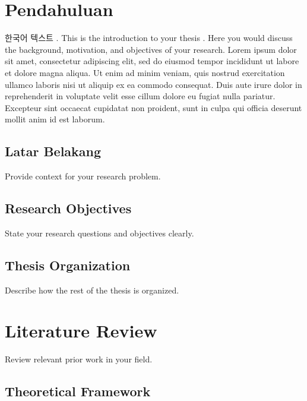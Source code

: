\newpage \cleardoublepage     %
\mainmatterpagenumbers %
\chapter{Pendahuluan}

한국어 텍스트 \cite{reference1}. This is the introduction to your thesis \cite{reference2}. Here you would discuss the background, motivation, and objectives of your research. 
Lorem ipsum dolor sit amet, consectetur adipiscing elit, sed do eiusmod tempor incididunt ut labore et dolore magna aliqua. Ut enim ad minim veniam, quis nostrud exercitation ullamco laboris nisi ut aliquip ex ea commodo consequat. Duis aute irure dolor in reprehenderit in voluptate velit esse cillum dolore eu fugiat nulla pariatur. Excepteur sint occaecat cupidatat non proident, sunt in culpa qui officia deserunt mollit anim id est laborum.

\section{Latar Belakang}

\noindent Provide context for your research problem.

\section{Research Objectives}

State your research questions and objectives clearly.

\section{Thesis Organization}

\noindent Describe how the rest of the thesis is organized.

\chapter{Literature Review}

Review relevant prior work in your field.

\section{Theoretical Framework}

